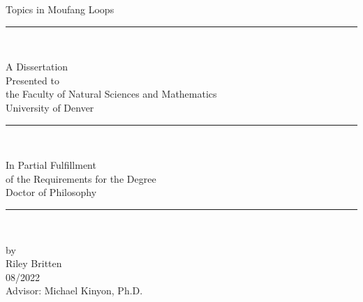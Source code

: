 \documentclass[12pt, twoside, openright]{report}
\theoremstyle{definition}
\begin{document}
\begin{titlepage}
	\vspace*{\fill}
	\centering
	{\normalsize
            	{Topics in Moufang Loops} \\

		\vspace{1cm}
            	\rule{0.2\linewidth}{0.5pt} \\
		\vspace{5mm}

            	{A Dissertation} \\ \vspace{3mm}
            	{Presented to} \\ \vspace{3mm}
            	{the Faculty of Natural Sciences and Mathematics}\\ \vspace{3mm}
            	{University of Denver} \\

		\vspace{1cm}
            	\rule{0.2\linewidth}{0.5pt} \\
		\vspace{5mm}

            	{In Partial Fulfillment} \\ \vspace{3mm}
            	{of the Requirements for the Degree} \\ \vspace{3mm}
            	{Doctor of Philosophy} \\

		\vspace{1cm}
            	\rule{0.2\linewidth}{0.5pt} \\
		\vspace{5mm}

            	{by} \\ \vspace{3mm}
            	{Riley Britten} \\ \vspace{3mm}
            	{08/2022} \\ \vspace{3mm}
            	{Advisor: Michael Kinyon, Ph.D.}
	}
	\vspace*{\fill}
\end{titlepage}
\end{document}

